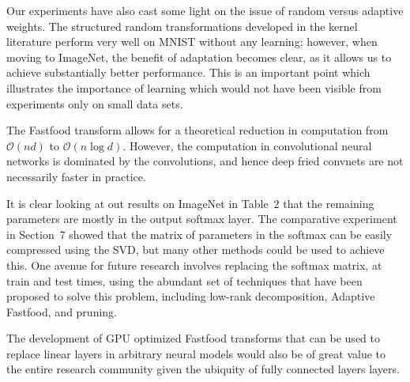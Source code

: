 \documentclass[10pt,twocolumn,letterpaper]{article}
\begin{document}
Our experiments have also cast some light on the issue of random versus adaptive weights. The structured random transformations developed in the kernel literature perform very well on MNIST without any learning; however, when moving to ImageNet, the benefit of adaptation becomes clear, as it allows us to achieve substantially better performance.  This is an important point which illustrates the importance of learning which would not have been visible from experiments only on small data sets.

The Fastfood transform allows for a theoretical reduction in computation from $\mathcal{O}(nd)$ to $\mathcal{O}(n\log d)$. However, the computation in convolutional neural networks is dominated by the convolutions, and hence deep fried convnets are not necessarily faster in practice.


It is clear looking at out results on ImageNet in Table~2 that the remaining parameters are mostly in the output softmax layer. The comparative experiment in Section~7 showed that the matrix of parameters in the softmax can be easily compressed using the SVD, but many other methods could be used to achieve this. One avenue for future research involves replacing the softmax matrix, at train and test times, using the abundant set of techniques that have been proposed to solve this problem, including low-rank decomposition, Adaptive Fastfood, and pruning.

The development of GPU optimized Fastfood transforms that can be used to replace linear layers in arbitrary neural models would also be of great value to the entire research community given the ubiquity of fully connected layers layers.





{\small


}
\end{document}
